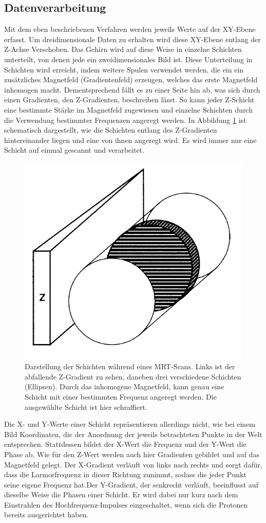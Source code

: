\subsection{Datenverarbeitung}

Mit dem eben beschriebenen Verfahren werden jeweils Werte auf der XY-Ebene erfasst. Um dreidimensionale Daten zu erhalten wird diese XY-Ebene entlang der Z-Achse Verschoben. Das Gehirn wird auf diese Weise in einzelne Schichten unterteilt, von denen jede ein zweidimensionales Bild ist.
Diese Unterteilung in Schichten wird erreicht, indem weitere Spulen verwendet werden, die ein ein zusätzliches Magnetfeld (Gradientenfeld) erzeugen, welches das erste Magnetfeld inhomogen macht. Dementsprechend fällt es zu einer Seite hin ab, was sich durch einen Gradienten, den Z-Gradienten, beschreiben lässt. So kann jeder Z-Schicht eine bestimmte Stärke im Magnetfeld zugewiesen und einzelne Schichten durch die Verwendung bestimmter Frequenzen angeregt werden. In Abbildung \ref{img:zGradient} ist schematisch dargestellt, wie die Schichten entlang des Z-Gradienten hintereinander liegen und eine von ihnen angeregt wird.
Es wird immer nur eine Schicht auf einmal gescannt und verarbeitet.

\begin{figure}
	\centering
	\includegraphics[width=0.3\linewidth]{images/zGradientMrt.png}
	\caption{Darstellung der Schichten während eines MRT-Scans. Links ist der abfallende Z-Gradient zu sehen, daneben drei verschiedene Schichten (Ellipsen). Durch das inhomogene Magnetfeld, kann genau eine Schicht mit einer bestimmten Frequenz angeregt werden. Die ausgewählte Schicht ist hier schraffiert. \cite{weishaupt09}}
	\label{img:zGradient}
\end{figure}


Die X- und Y-Werte einer Schicht repräsentieren allerdings nicht, wie bei einem Bild Koordinaten, die der Anordnung der jeweils betrachteten Punkte in der Welt entsprechen. Stattdessen bildet der X-Wert die Frequenz und der Y-Wert die Phase ab. Wie für den Z-Wert werden auch hier Gradienten gebildet und auf das Magnetfeld gelegt. Der X-Gradient verläuft von links nach rechts und sorgt dafür, dass die Larmorfrequenz in dieser Richtung zunimmt, sodass die jeder Punkt seine eigene Frequenz hat.Der Y-Gradient, der senkrecht verläuft, beeinflusst auf dieselbe Weise die Phasen einer Schicht. Er wird dabei nur kurz nach dem Einstrahlen des Hochfrequenz-Impulses eingeschaltet, wenn sich die Protonen bereits ausgerichtet haben.


